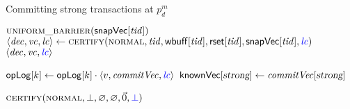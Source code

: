 
\begin{algorithm*}[t]
  \caption{Committing strong transactions at $p^{m}_{d}$}
  \label{alg:unistore-strong-commit}
  \begin{algorithmic}[1]
    \Function{\commitstrong}{$\tidvar, \lccolor{\lcvar}$}
      \label{line:function-commitstrong}
      \State $\textsc{uniform\_barrier}({\sf snapVec}[\mathit{tid}])$
        \label{line:commitstrong-call-uniformbarrier}
      \State $\langle \decvar, \vcvar, \lcvar \rangle \gets
        \Call{\certify}{\normalMode,
          \tidvar, \wbuff[\tidvar], \rset[\tidvar], \snapVC[\tidvar], \lccolor{\lcvar}}$
        \label{line:commitstrong-call-certify}
      \State \Return $\langle \mathit{dec}, \mathit{vc}, \textcolor{blue}{\mathit{lc}} \rangle$
        \label{line:commitstrong-return}
        \label{line:commitstrong-commitvc-of-t-strong}
    \EndFunction

    \Statex
    \Upon[\deliverupdates($\txsvar$)]
      \label{line:function-deliverupdates}
        \label{line:deliverupdates-foreach-wbuff}
            \label{line:deliverupdates-foreach-kv}
            \State ${\sf opLog}[k] \gets {\sf opLog}[k] \cdot \langle v, \mathit{commitVec}, \textcolor{blue}{\mathit{lc}} \rangle$
              \label{line:deliverupdates-oplog}
          \EndFor
        \State ${\sf knownVec}[\textsl{strong}] \gets \mathit{commitVec}[\textsl{strong}]$
          \label{line:deliverupdates-knownvc-strongentry}
      \EndFor
    \EndUpon

    \Statex
    \Function{\heartbeatstrong}{\null} 
      \label{line:function-heartbeatstrong}
      \State \Return $\Call{\certify}{\normalMode, \bot, \emptyset, \emptyset, \vec{0}, \lccolor{\bot}}$
        \label{line:heartbeatstrong-call-certify}
    \EndFunction
  \end{algorithmic}
\end{algorithm*}